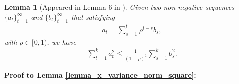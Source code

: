 \documentclass{article}
\newtheorem{Lemma}{\bf{Lemma}}
\begin{document}
\begin{Lemma}[Appeared in Lemma $6$ in \citep{Tang:2018un}]
\label{lemma_hanlin_2}
Given two non-negative sequences $\{a_t\}_{t=1}^{\infty}$ and $\{b_t\}_{t=1}^{\infty}$ that satisfying
\begin{align}
\nonumber
a_t = \sum_{s=1}^t \rho^{t-s} b_s,
\end{align} with $\rho \in [0,1)$, we have
\begin{align}
\nonumber
\sum_{t=1}^k a_t^2 \le \frac{1}{(1-\rho)^2}\sum_{s=1}^k b_s^2.
\end{align}
\end{Lemma}





\textbf{ Proof to Lemma \ref{lemma_x_variance_norm_square}:}
%
\end{document}
